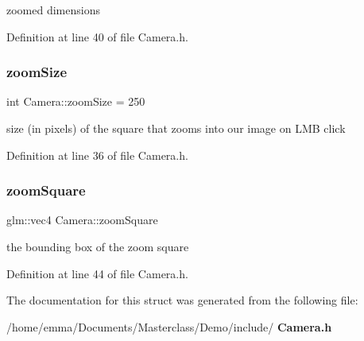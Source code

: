 zoomed dimensions 



Definition at line 40 of file Camera.\+h.

\mbox{\label{struct_camera_a6c16a6c3ae9bcb17c63bc499bdbbe287}} 
\subsubsection{zoomSize}
{\footnotesize\ttfamily int Camera\+::zoom\+Size = 250}



size (in pixels) of the square that zooms into our image on L\+MB click 



Definition at line 36 of file Camera.\+h.

\mbox{\label{struct_camera_a1777fb1bafb5ab01be8bf44cbac1943a}} 
\subsubsection{zoomSquare}
{\footnotesize\ttfamily glm\+::vec4 Camera\+::zoom\+Square}



the bounding box of the zoom square 



Definition at line 44 of file Camera.\+h.



The documentation for this struct was generated from the following file\+:\begin{DoxyCompactItemize}
\item 
/home/emma/\+Documents/\+Masterclass/\+Demo/include/\textbf{ Camera.\+h}\end{DoxyCompactItemize}
